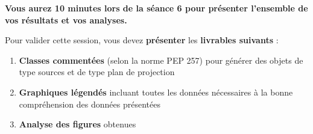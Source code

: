 
\textbf{Vous aurez 10 minutes lors de la séance 6 pour présenter l'ensemble de vos résultats et vos analyses.}

Pour valider cette session, vous devez \textbf{présenter} les \textbf{livrables suivants} :

\begin{enumerate}
\item \textbf{Classes commentées} (selon la norme PEP 257) pour générer des objets de type sources et de type plan de projection
\item \textbf{Graphiques légendés} incluant toutes les données nécessaires à la bonne compréhension des données présentées
\item \textbf{Analyse des figures} obtenues
\end{enumerate}
